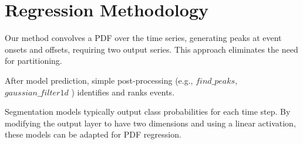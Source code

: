 \documentclass{article}
\begin{document}
\section{Regression Methodology}
\label{section:method}




Our method convolves a PDF over the time series, generating peaks at event onsets and offsets, requiring two output series. This approach eliminates the need for partitioning.

After model prediction, simple post-processing (e.g., $find\_peaks$, $gaussian\_filter1d$ \citep{virtanen2020}) identifies and ranks events.

Segmentation models typically output class probabilities for each time step. By modifying the output layer to have two dimensions and using a linear activation, these models can be adapted for PDF regression.
\end{document}
